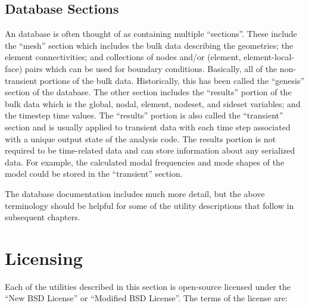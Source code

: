 \subsection{Database Sections}
An \exo{} database is often thought of as containing multiple
``sections''.  These include the ``mesh'' section which includes the
bulk data describing the geometries; the element connectivities; and
collections of nodes and/or (element, element-local-face) pairs which
can be used for boundary conditions.  Basically, all of the
non-transient portions of the bulk data.  Historically, this has been
called the ``genesis'' section of the \exo{} database.  The other
section includes the ``results'' portion of the bulk data which is the
global, nodal, element, nodeset, and sideset variables; and the
timestep time values. The ``results'' portion is also called the
``transient'' section and is usually applied to transient data with
each time step associated with a unique output state of the analysis
code. The results portion is not required to be time-related data and
can store information about any serialized data. For example, the
calculated modal frequencies and mode shapes of the model could be
stored in the ``transient'' section.

The \exo{} database documentation includes much more detail, but the
above terminology should be helpful for some of the utility
descriptions that follow in subsequent chapters.

\section{Licensing}
Each of the utilities described in this section is open-source
licensed under the ``New BSD License'' or ``Modified BSD License''.
The terms of the license are:

